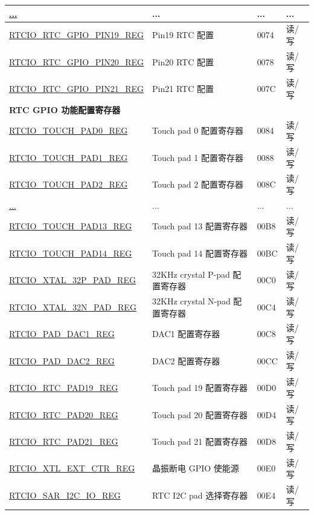 \begin{longtable}{ | p{6.2cm} | p{7cm} | p{1.3cm} | p{1cm} | }
\hyperref[regdesc:RTCIORTCGPIOPINNREG]{...} & ... & ... & ... \\ \hline
\hyperref[regdesc:RTCIORTCGPIOPINNREG]{RTCIO\_RTC\_GPIO\_PIN19\_REG} & Pin19 RTC 配置 & \hexprefix{}0074 & 读/写 \\ \hline
\hyperref[regdesc:RTCIORTCGPIOPINNREG]{RTCIO\_RTC\_GPIO\_PIN20\_REG} & Pin20 RTC 配置 & \hexprefix{}0078 & 读/写 \\ \hline
\hyperref[regdesc:RTCIORTCGPIOPINNREG]{RTCIO\_RTC\_GPIO\_PIN21\_REG} & Pin21 RTC 配置 & \hexprefix{}007C & 读/写 \\ \hline
\multicolumn{4}{|l|}{\textbf{RTC GPIO 功能配置寄存器}} \\ \hline
\hyperref[regdesc:RTCIOTOUCHPADNREG]{RTCIO\_TOUCH\_PAD0\_REG} & Touch pad 0 配置寄存器 & \hexprefix{}0084 & 读/写 \\ \hline
\hyperref[regdesc:RTCIOTOUCHPADNREG]{RTCIO\_TOUCH\_PAD1\_REG} & Touch pad 1 配置寄存器 & \hexprefix{}0088 & 读/写 \\ \hline
\hyperref[regdesc:RTCIOTOUCHPADNREG]{RTCIO\_TOUCH\_PAD2\_REG} & Touch pad 2 配置寄存器 & \hexprefix{}008C & 读/写 \\ \hline
\hyperref[regdesc:RTCIOTOUCHPADNREG]{...} & ... & ... & ... \\ \hline
\hyperref[regdesc:RTCIOTOUCHPADNREG]{RTCIO\_TOUCH\_PAD13\_REG} & Touch pad 13 配置寄存器 & \hexprefix{}00B8 & 读/写 \\ \hline
\hyperref[regdesc:RTCIOTOUCHPADNREG]{RTCIO\_TOUCH\_PAD14\_REG} & Touch pad 14 配置寄存器 & \hexprefix{}00BC & 读/写 \\ \hline
\hyperref[regdesc:RTCIOXTAL32PPADREG]{RTCIO\_XTAL\_32P\_PAD\_REG} & 32KHz crystal P-pad 配置寄存器 & \hexprefix{}00C0 & 读/写 \\ \hline
\hyperref[regdesc:RTCIOXTAL32NPADREG]{RTCIO\_XTAL\_32N\_PAD\_REG} & 32KHz crystal N-pad 配置寄存器 & \hexprefix{}00C4 & 读/写 \\ \hline
\hyperref[regdesc:RTCIOPADDAC1REG]{RTCIO\_PAD\_DAC1\_REG} & DAC1 配置寄存器 & \hexprefix{}00C8 & 读/写 \\ \hline
\hyperref[regdesc:RTCIOPADDAC2REG]{RTCIO\_PAD\_DAC2\_REG} & DAC2 配置寄存器 & \hexprefix{}00CC & 读/写 \\ \hline
\hyperref[regdesc:RTCIORTCPAD19REG]{RTCIO\_RTC\_PAD19\_REG} & Touch pad 19 配置寄存器 & \hexprefix{}00D0 & 读/写 \\ \hline
\hyperref[regdesc:RTCIORTCPAD20REG]{RTCIO\_RTC\_PAD20\_REG} & Touch pad 20 配置寄存器 & \hexprefix{}00D4 & 读/写 \\ \hline
\hyperref[regdesc:RTCIORTCPAD21REG]{RTCIO\_RTC\_PAD21\_REG} & Touch pad 21 配置寄存器 & \hexprefix{}00D8 & 读/写 \\ \hline
\hyperref[regdesc:RTCIOXTLEXTCTRREG]{RTCIO\_XTL\_EXT\_CTR\_REG} & 晶振断电 GPIO 使能源 & \hexprefix{}00E0 & 读/写 \\ \hline
\hyperref[regdesc:RTCIOSARI2CIOREG]{RTCIO\_SAR\_I2C\_IO\_REG} & RTC I2C pad 选择寄存器 & \hexprefix{}00E4 & 读/写 \\ \hline
\end{longtable}
